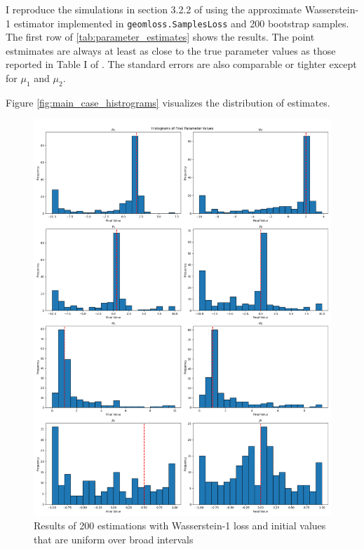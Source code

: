 I reproduce the simulations in section 3.2.2 of \textcite{kaji2023adversarial} using the approximate Wasserstein-1 estimator implemented in \texttt{geomloss.SamplesLoss} and 200 bootstrap samples.
The first row of \ref{tab:parameter_estimates} shows the results.
The point estmimates are always at least as close to the true parameter values as those reported in Table I of \cite{kaji2023adversarial}.
The standard errors are also comparable or tighter except for $\mu_1$ and $\mu_2$.

Figure \ref{fig:main_case_histrograms} visualizes the distribution of estimates.

\begin{figure}
    \includegraphics[width=\textwidth]{./Images/wide_uniform_histograms.png}
    \caption{Results of 200 estimations with Wasserstein-1 loss and initial values that are uniform over broad intervals}
    \label{fig:wide_uniform_histograms}
\end{figure}

